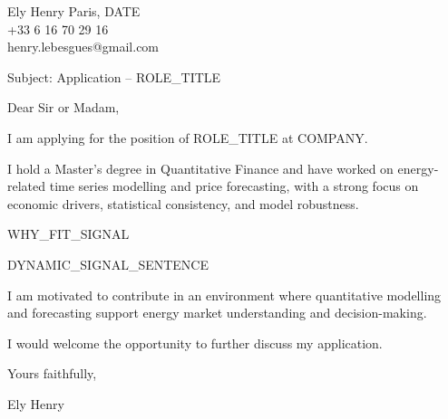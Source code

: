 \documentclass[10pt,a4paper]{article}
\begin{document}
\noindent Ely Henry \hfill Paris, {{DATE}} \\
+33 6 16 70 29 16 \\
henry.lebesgues@gmail.com \\

\vspace{1cm}

\noindent Subject: Application – {{ROLE_TITLE}}

\vspace{0.5cm}

Dear Sir or Madam,

\vspace{0.5cm}

I am applying for the position of {{ROLE_TITLE}} at {{COMPANY}}.

I hold a Master’s degree in Quantitative Finance and have worked on energy-related time series modelling and price forecasting, with a strong focus on economic drivers, statistical consistency, and model robustness.

{{WHY_FIT_SIGNAL}}

{{DYNAMIC_SIGNAL_SENTENCE}}

I am motivated to contribute in an environment where quantitative modelling and forecasting support energy market understanding and decision-making.

I would welcome the opportunity to further discuss my application.

Yours faithfully,

\vspace{1cm}

\noindent Ely Henry
\end{document}
